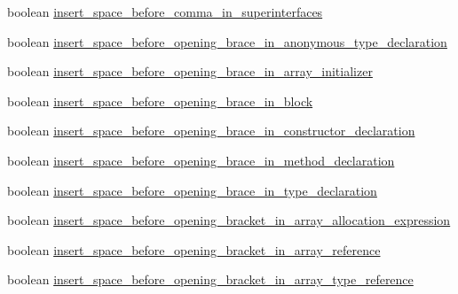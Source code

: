\begin{DoxyCompactItemize}
\item 
boolean \hyperlink{classorg_1_1eclipse_1_1jdt_1_1ui_1_1tests_1_1refactoring_1_1infra_1_1TestFormatterOptions_a210098bb64f1fa18e7a160e24d27ddc0}{insert\_\-space\_\-before\_\-comma\_\-in\_\-superinterfaces}
\item 
boolean \hyperlink{classorg_1_1eclipse_1_1jdt_1_1ui_1_1tests_1_1refactoring_1_1infra_1_1TestFormatterOptions_a6d59b15578d12e6ff75950ed54e9c600}{insert\_\-space\_\-before\_\-opening\_\-brace\_\-in\_\-anonymous\_\-type\_\-declaration}
\item 
boolean \hyperlink{classorg_1_1eclipse_1_1jdt_1_1ui_1_1tests_1_1refactoring_1_1infra_1_1TestFormatterOptions_aa6a91fb6449d33258f583da09eb438f9}{insert\_\-space\_\-before\_\-opening\_\-brace\_\-in\_\-array\_\-initializer}
\item 
boolean \hyperlink{classorg_1_1eclipse_1_1jdt_1_1ui_1_1tests_1_1refactoring_1_1infra_1_1TestFormatterOptions_ab99246f5d83bc2d4fe388b04251bbc13}{insert\_\-space\_\-before\_\-opening\_\-brace\_\-in\_\-block}
\item 
boolean \hyperlink{classorg_1_1eclipse_1_1jdt_1_1ui_1_1tests_1_1refactoring_1_1infra_1_1TestFormatterOptions_a857ec90ac0430d6b6ea401fe59aa1def}{insert\_\-space\_\-before\_\-opening\_\-brace\_\-in\_\-constructor\_\-declaration}
\item 
boolean \hyperlink{classorg_1_1eclipse_1_1jdt_1_1ui_1_1tests_1_1refactoring_1_1infra_1_1TestFormatterOptions_a110fda14660719133734dbe9eaded100}{insert\_\-space\_\-before\_\-opening\_\-brace\_\-in\_\-method\_\-declaration}
\item 
boolean \hyperlink{classorg_1_1eclipse_1_1jdt_1_1ui_1_1tests_1_1refactoring_1_1infra_1_1TestFormatterOptions_acbcce2d6f140566da056a92cb5b5c46b}{insert\_\-space\_\-before\_\-opening\_\-brace\_\-in\_\-type\_\-declaration}
\item 
boolean \hyperlink{classorg_1_1eclipse_1_1jdt_1_1ui_1_1tests_1_1refactoring_1_1infra_1_1TestFormatterOptions_a73db69ee9702b5d748ffa54edd5ec3b8}{insert\_\-space\_\-before\_\-opening\_\-bracket\_\-in\_\-array\_\-allocation\_\-expression}
\item 
boolean \hyperlink{classorg_1_1eclipse_1_1jdt_1_1ui_1_1tests_1_1refactoring_1_1infra_1_1TestFormatterOptions_abfc8e79f5ec2c80139436aa5942b4a8a}{insert\_\-space\_\-before\_\-opening\_\-bracket\_\-in\_\-array\_\-reference}
\item 
boolean \hyperlink{classorg_1_1eclipse_1_1jdt_1_1ui_1_1tests_1_1refactoring_1_1infra_1_1TestFormatterOptions_a940a36b8087fa43cbd8464f63b25fcf0}{insert\_\-space\_\-before\_\-opening\_\-bracket\_\-in\_\-array\_\-type\_\-reference}

\end{DoxyCompactItemize}
